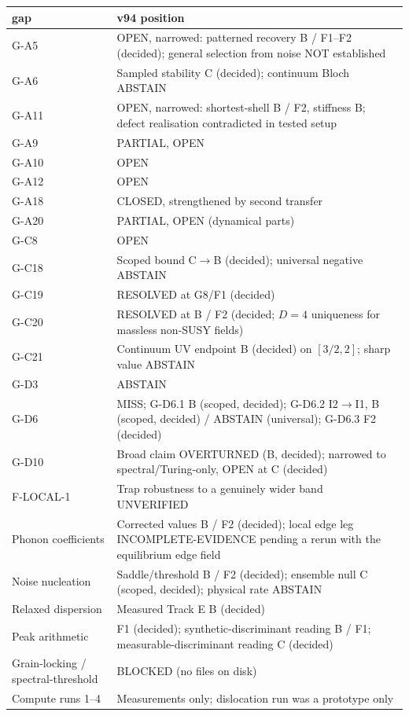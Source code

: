 \documentclass[a4paper,11pt]{article}
\begin{document}
\begin{center}
\begin{xltabular}{\linewidth}{l>{\raggedright\arraybackslash}X}
\hline
gap & v94 position \\
\hline
G-A5 & OPEN, narrowed: patterned recovery B / F1--F2 (decided); general selection from noise NOT established \\
G-A6 & Sampled stability C (decided); continuum Bloch ABSTAIN \\
G-A11 & OPEN, narrowed: shortest-shell B / F2, stiffness B; defect realisation contradicted in tested setup \\
G-A9 & PARTIAL, OPEN \\
G-A10 & OPEN \\
G-A12 & OPEN \\
G-A18 & CLOSED, strengthened by second transfer \\
G-A20 & PARTIAL, OPEN (dynamical parts) \\
G-C8 & OPEN \\
G-C18 & Scoped bound C$\to$B (decided); universal negative ABSTAIN \\
G-C19 & RESOLVED at G8/F1 (decided) \\
G-C20 & RESOLVED at B / F2 (decided; $D=4$ uniqueness for massless non-SUSY fields) \\
G-C21 & Continuum UV endpoint B (decided) on $[3/2,2]$; sharp value ABSTAIN \\
G-D3 & ABSTAIN \\
G-D6 & MISS; G-D6.1 B (scoped, decided); G-D6.2 I2$\to$I1, B (scoped, decided) / ABSTAIN (universal); G-D6.3 F2 (decided) \\
G-D10 & Broad claim OVERTURNED (B, decided); narrowed to spectral/Turing-only, OPEN at C (decided) \\
F-LOCAL-1 & Trap robustness to a genuinely wider band UNVERIFIED \\
Phonon coefficients & Corrected values B / F2 (decided); local edge leg INCOMPLETE-EVIDENCE pending a rerun with the equilibrium edge field \\
Noise nucleation & Saddle/threshold B / F2 (decided); ensemble null C (scoped, decided); physical rate ABSTAIN \\
Relaxed dispersion & Measured Track E B (decided) \\
Peak arithmetic & F1 (decided); synthetic-discriminant reading B / F1; measurable-discriminant reading C (decided) \\
Grain-locking / spectral-threshold & BLOCKED (no files on disk) \\
Compute runs 1--4 & Measurements only; dislocation run was a prototype only \\
\hline
\end{xltabular}
\end{center}
\end{document}
